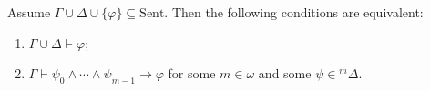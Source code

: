 Assume $\Gamma \cup \Delta \cup \{\varphi\} \subseteq \text{Sent}$. Then the following conditions are equivalent:

\begin{enumerate}
\item[(i)] $\Gamma \cup \Delta \vdash \varphi$;
\item[(ii)] $\Gamma \vdash \psi_0 \wedge \cdots \wedge \psi_{m-1} \rightarrow \varphi$ for some $m \in \omega$ and some $\psi \in {}^m\Delta$.
\end{enumerate}
